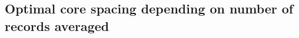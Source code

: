 \documentclass[cp, manuscript]{copernicus}
\begin{document}
\subsection{Optimal core spacing depending on number of records averaged}
\label{results:optim-spacing}




































% 
% 
\end{document}
